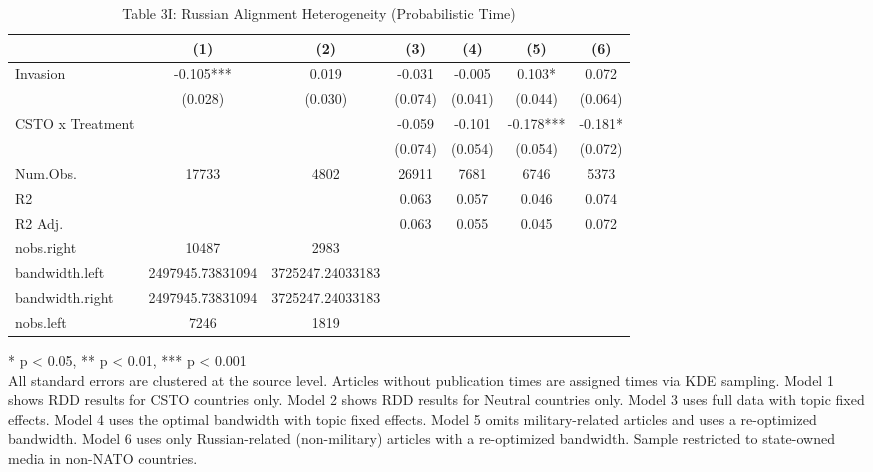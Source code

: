 \begin{table}[!t]
\caption{Table 3I: Russian Alignment Heterogeneity (Probabilistic Time)} 
\fontsize{12.0pt}{14.4pt}\selectfont
\begin{tabular*}{\linewidth}{@{\extracolsep{\fill}}lcccccc}
\toprule
  & (1) & (2) & (3) & (4) & (5) & (6) \\ 
\midrule\addlinespace[2.5pt]
Invasion & -0.105*** & 0.019 & -0.031 & -0.005 & 0.103* & 0.072 \\ 
 & (0.028) & (0.030) & (0.074) & (0.041) & (0.044) & (0.064) \\ 
CSTO x Treatment &  &  & -0.059 & -0.101 & -0.178*** & -0.181* \\ 
{} & {} & {} & {(0.074)} & {(0.054)} & {(0.054)} & {(0.072)} \\ 
Num.Obs. & 17733 & 4802 & 26911 & 7681 & 6746 & 5373 \\ 
R2 &  &  & 0.063 & 0.057 & 0.046 & 0.074 \\ 
R2 Adj. &  &  & 0.063 & 0.055 & 0.045 & 0.072 \\ 
nobs.right & 10487 & 2983 &  &  &  &  \\ 
bandwidth.left & 2497945.73831094 & 3725247.24033183 &  &  &  &  \\ 
bandwidth.right & 2497945.73831094 & 3725247.24033183 &  &  &  &  \\ 
nobs.left & 7246 & 1819 &  &  &  &  \\ 
\bottomrule
\end{tabular*}
\begin{minipage}{\linewidth}
* p < 0.05, ** p < 0.01, *** p < 0.001\\
All standard errors are clustered at the source level. Articles without
publication times are assigned times via KDE sampling. Model 1 shows RDD results
for CSTO countries only. Model 2 shows RDD results for Neutral countries only.
Model 3 uses full data with topic fixed effects. Model 4 uses the optimal
bandwidth with topic fixed effects. Model 5 omits military-related articles and
uses a re-optimized bandwidth. Model 6 uses only Russian-related (non-military)
articles with a re-optimized bandwidth. Sample restricted to state-owned media
in non-NATO countries.\\
\end{minipage}
\end{table}

